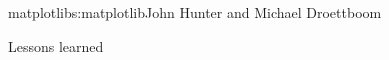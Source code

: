 \begin{aosachapter}{matplotlib}{s:matplotlib}{John Hunter and Michael Droettboom}
\begin{aosasect1}{Lessons learned}
\end{aosasect1}
\end{aosachapter}


